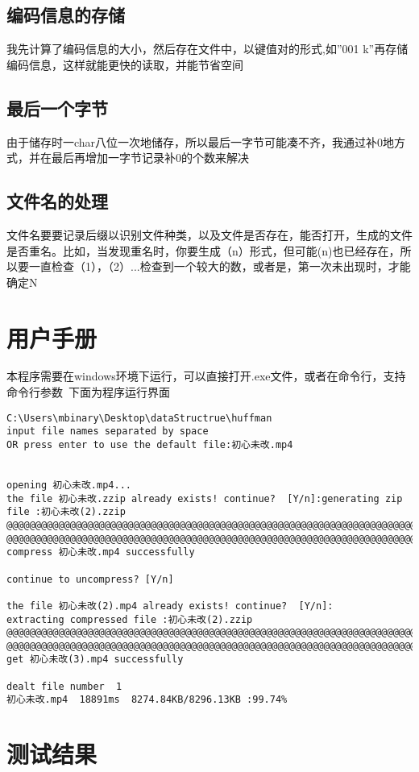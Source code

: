 \documentclass[UTF8]{ctexart}
\begin{document}
\subsection{编码信息的存储}
我先计算了编码信息的大小，然后存在文件中，以键值对的形式,如''001 k''再存储编码信息，这样就能更快的读取，并能节省空间
\subsection{最后一个字节}
由于储存时一char八位一次地储存，所以最后一字节可能凑不齐，我通过补0地方式，并在最后再增加一字节记录补0的个数来解决
\subsection{文件名的处理}
文件名要要记录后缀以识别文件种类，以及文件是否存在，能否打开，生成的文件是否重名。比如，当发现重名时，你要生成（n）形式，但可能(n)也已经存在，所以要一直检查（1），（2）...检查到一个较大的数，或者是，第一次未出现时，才能确定N


\section{用户手册}
本程序需要在windows环境下运行，可以直接打开.exe文件，或者在命令行，支持命令行参数\
下面为程序运行界面
\begin{verbatim}
C:\Users\mbinary\Desktop\dataStructrue\huffman
input file names separated by space
OR press enter to use the default file:初心未改.mp4


opening 初心未改.mp4...
the file 初心未改.zzip already exists! continue?  [Y/n]:generating zip file :初心未改(2).zzip
@@@@@@@@@@@@@@@@@@@@@@@@@@@@@@@@@@@@@@@@@@@@@@@@@@@@@@@@@@@@@@@@@@@@@@@@@@@@@@@@
@@@@@@@@@@@@@@@@@@@@@@@@@@@@@@@@@@@@@@@@@@@@@@@@@@@@@@@@@@@@@@@@@@@@@@@@@@@@@@@@
compress 初心未改.mp4 successfully

continue to uncompress? [Y/n]

the file 初心未改(2).mp4 already exists! continue?  [Y/n]:
extracting compressed file :初心未改(2).zzip
@@@@@@@@@@@@@@@@@@@@@@@@@@@@@@@@@@@@@@@@@@@@@@@@@@@@@@@@@@@@@@@@@@@@@@@@@@@@@@@@
@@@@@@@@@@@@@@@@@@@@@@@@@@@@@@@@@@@@@@@@@@@@@@@@@@@@@@@@@@@@@@@@@@@@@@@@@@@@@@@@
get 初心未改(3).mp4 successfully

dealt file number  1
初心未改.mp4  18891ms  8274.84KB/8296.13KB :99.74%
\end{verbatim}

\section{测试结果}
\end{document}
